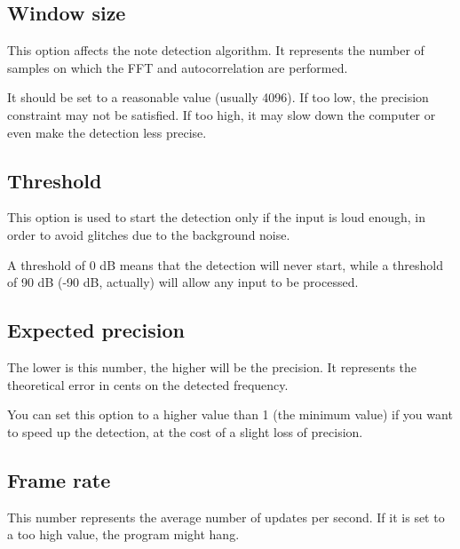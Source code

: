 \subsection{Window size}\label{windowsize}

This option affects the note detection algorithm. It represents the number
of samples on which the FFT and autocorrelation are performed.

It should be set to a reasonable value (usually 4096).
If too low, the precision constraint may not be satisfied. If too high,
it may slow down the computer or even make the detection less precise.

\subsection{Threshold}\label{threshold}

This option is used to start the detection only if the input is loud enough,
in order to avoid glitches due to the background noise.

A threshold of 0 dB means that the detection will never start, while a threshold
of 90 dB (-90 dB, actually) will allow any input to be processed.

\subsection{Expected precision}\label{expectedprecision}

The lower is this number, the higher will be the precision. It represents the
theoretical error in cents on the detected frequency.

You can set this option to a higher value than 1 (the minimum value)
if you want to speed up the detection, at the cost of a slight loss of precision.

\subsection{Frame rate}\label{framerate}

This number represents the average number of updates per second. If it is set to 
a too high value, the program might hang.


